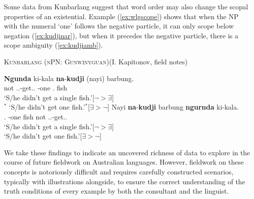 \documentclass[12pt,egregdoesnotlikesansseriftitles]{scrartcl}
\begin{document}
Some data from Kunbarlang  suggest that word  order may also change the scopal properties of an existential. Example (\ref{ex:wlgscope}) shows that when the NP with the numeral `one' follows the negative particle, it can only scope below negation (\ref{ex:kudjinar}), but when it precedes the negative particle, there is a scope ambiguity (\ref{ex:kudjiamb}).
\begin{exe}
  \ex\label{ex:wlgscope} \textsc{Kunbarlang (nPN: Gunwinyguan)}\hfill (I. Kapitonov, field notes) %
  \begin{xlist}
    \ex\label{ex:kudjinar} \gll \textbf{Ngunda} ki-kala \textbf{na}-\textbf{kudji} (nayi) barbung.\\
    not \Tsg.\Irr.\Pst-get.\Irr.\Pst{} \Cli-one \phantom{(}\Nm.\Cli{} fish\\
    \glt `S/he didn't get a single fish.'\hfill [$\neg > \exists$]\\
    $^*$ `S/he didn't get one fish.'\hfill $^*$[$\exists > \neg$]
    \ex\label{ex:kudjiamb} \gll Nayi \textbf{na}-\textbf{kudji} barbung \textbf{ngurnda} ki-kala.\\
    \Nm.\Cli{} \Cli-one fish not \Tsg.\Irr.\Pst-get.\Irr.\Pst\\
    \glt `S/he didn't get a single fish.'\hfill [$\neg > \exists$]\\
    `S/he didn't get one fish.'\hfill [$\exists > \neg$]
  \end{xlist}
\end{exe}


We take these findings to indicate an uncovered richness of data to explore in the course of future fieldwork on Australian languages. However, fieldwork on these concepts is notoriously difficult and requires carefully constructed scenarios, typically with illustrations alongside, to ensure the correct understanding of the truth conditions of every example by both the consultant and the linguist.
\end{document}
